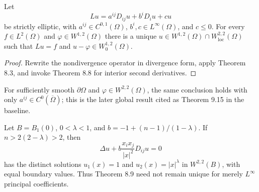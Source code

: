\begin{theorem}
\label{gt-thm-8-9-strong-dirichlet-solvability}
Let
\begin{equation}
Lu=a^{ij}D_{ij}u+b^iD_iu+cu
\tag{8.21}
\end{equation}
be strictly elliptic, with
$a^{ij}\in C^{0,1}(\Omega)$, $b^i,c\in L^\infty(\Omega)$, and $c\leq0$.
For every $f\in L^2(\Omega)$ and $\varphi\in W^{1,2}(\Omega)$ there is a unique
$u\in W^{1,2}(\Omega)\cap W^{2,2}_{\mathrm{loc}}(\Omega)$ such that
$Lu=f$ and $u-\varphi\in W_0^{1,2}(\Omega)$.
\end{theorem}
\begin{proof}
\sketch Rewrite the nondivergence operator in divergence form, apply Theorem 8.3,
and invoke Theorem 8.8 for interior second derivatives.
\end{proof}

\begin{remark}
\label{gt-rem-8-continuous-principal-coefficients}
For sufficiently smooth $\partial\Omega$ and $\varphi\in W^{2,2}(\Omega)$,
the same conclusion holds with only $a^{ij}\in C^0(\overline\Omega)$; this is
the later global result cited as Theorem 9.15 in the baseline.
\end{remark}

\begin{example}
\label{gt-ex-8-discontinuous-principal-nonuniqueness}
Let $B=B_1(0)$, $0<\lambda<1$, and
$b=-1+(n-1)/(1-\lambda)$. If $n>2(2-\lambda)>2$, then
\begin{equation}
\Delta u+b\frac{x_ix_j}{|x|^2}D_{ij}u=0
\tag{8.22}
\end{equation}
has the distinct solutions $u_1(x)=1$ and $u_2(x)=|x|^\lambda$ in
$W^{2,2}(B)$, with equal boundary values. Thus Theorem 8.9 need not remain
unique for merely $L^\infty$ principal coefficients.
\end{example}

